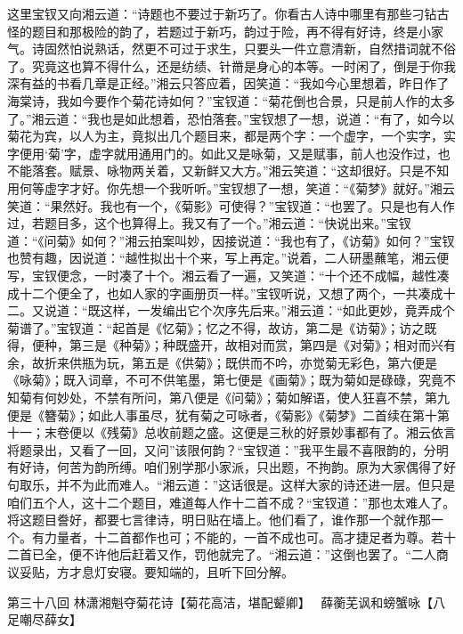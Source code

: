 \documentclass[12pt,oneside]{book}
\begin{document}
这里宝钗又向湘云道：“诗题也不要过于新巧了。你看古人诗中哪里有那些刁钻古怪的题目和那极险的韵了，若题过于新巧，韵过于险，再不得有好诗，终是小家气。诗固然怕说熟话，然更不可过于求生，只要头一件立意清新，自然措词就不俗了。究竟这也算不得什么，还是纺绩、针黹是身心的本等。一时闲了，倒是于你我深有益的书看几章是正经。”湘云只答应着，因笑道：“我如今心里想着，昨日作了海棠诗，我如今要作个菊花诗如何？”宝钗道：“菊花倒也合景，只是前人作的太多了。”湘云道：“我也是如此想着，恐怕落套。”宝钗想了一想，说道：“有了，如今以菊花为宾，以人为主，竟拟出几个题目来，都是两个字：一个虚字，一个实字，实字便用‘菊’字，虚字就用通用门的。如此又是咏菊，又是赋事，前人也没作过，也不能落套。赋景、咏物两关着，又新鲜又大方。”湘云笑道：“这却很好。只是不知用何等虚字才好。你先想一个我听听。”宝钗想了一想，笑道：“《菊梦》就好。”湘云笑道：“果然好。我也有一个，《菊影》可使得？”宝钗道：“也罢了。只是也有人作过，若题目多，这个也算得上。我又有了一个。”湘云道：“快说出来。”宝钗道：“《问菊》如何？”湘云拍案叫妙，因接说道：“我也有了，《访菊》如何？”宝钗也赞有趣，因说道：“越性拟出十个来，写上再定。”说着，二人研墨蘸笔，湘云便写，宝钗便念，一时凑了十个。湘云看了一遍，又笑道：“十个还不成幅，越性凑成十二个便全了，也如人家的字画册页一样。”宝钗听说，又想了两个，一共凑成十二。又说道：“既这样，一发编出它个次序先后来。”湘云道：“如此更妙，竟弄成个菊谱了。”宝钗道：“起首是《忆菊》；忆之不得，故访，第二是《访菊》；访之既得，便种，第三是《种菊》；种既盛开，故相对而赏，第四是《对菊》；相对而兴有余，故折来供瓶为玩，第五是《供菊》；既供而不吟，亦觉菊无彩色，第六便是《咏菊》；既入词章，不可不供笔墨，第七便是《画菊》；既为菊如是碌碌，究竟不知菊有何妙处，不禁有所问，第八便是《问菊》；菊如解语，使人狂喜不禁，第九便是《簪菊》；如此人事虽尽，犹有菊之可咏者，《菊影》《菊梦》二首续在第十第十一；末卷便以《残菊》总收前题之盛。这便是三秋的好景妙事都有了。湘云依言将题录出，又看了一回，又问”该限何韵？“宝钗道：”我平生最不喜限韵的，分明有好诗，何苦为韵所缚。咱们别学那小家派，只出题，不拘韵。原为大家偶得了好句取乐，并不为此而难人。“湘云道：”这话很是。这样大家的诗还进一层。但只是咱们五个人，这十二个题目，难道每人作十二首不成？“宝钗道：”那也太难人了。将这题目誊好，都要七言律诗，明日贴在墙上。他们看了，谁作那一个就作那一个。有力量者，十二首都作也可；不能的，一首不成也可。高才捷足者为尊。若十二首已全，便不许他后赶着又作，罚他就完了。“湘云道：”这倒也罢了。“二人商议妥贴，方才息灯安寝。要知端的，且听下回分解。


 
第三十八回  林潇湘魁夺菊花诗【菊花高洁，堪配颦卿】　
薛蘅芜讽和螃蟹咏【八足嘲尽薛女】
\end{document}

